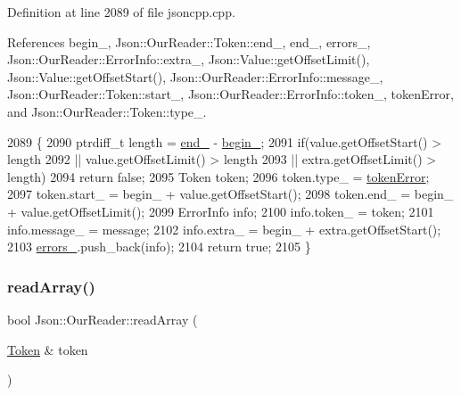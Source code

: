 Definition at line 2089 of file jsoncpp.\+cpp.



References begin\+\_\+, Json\+::\+Our\+Reader\+::\+Token\+::end\+\_\+, end\+\_\+, errors\+\_\+, Json\+::\+Our\+Reader\+::\+Error\+Info\+::extra\+\_\+, Json\+::\+Value\+::get\+Offset\+Limit(), Json\+::\+Value\+::get\+Offset\+Start(), Json\+::\+Our\+Reader\+::\+Error\+Info\+::message\+\_\+, Json\+::\+Our\+Reader\+::\+Token\+::start\+\_\+, Json\+::\+Our\+Reader\+::\+Error\+Info\+::token\+\_\+, token\+Error, and Json\+::\+Our\+Reader\+::\+Token\+::type\+\_\+.


\begin{DoxyCode}
2089                                                                                                \{
2090   ptrdiff\_t length = \hyperlink{class_json_1_1_our_reader_ab1f69b0260c27a0d2d65dc56e42c8f9d}{end\_} - \hyperlink{class_json_1_1_our_reader_a9bda9d72335d52cd06e65f9eca3f70f5}{begin\_};
2091   \textcolor{keywordflow}{if}(value.getOffsetStart() > length
2092     || value.getOffsetLimit() > length
2093     || extra.getOffsetLimit() > length)
2094     \textcolor{keywordflow}{return} \textcolor{keyword}{false};
2095   Token token;
2096   token.type\_ = \hyperlink{class_json_1_1_our_reader_a15116f7276ddf1e7a2cc3cbefa884dccad39f929b971de8dc55fe84a2d2e3465e}{tokenError};
2097   token.start\_ = begin\_ + value.getOffsetStart();
2098   token.end\_ = begin\_ + value.getOffsetLimit();
2099   ErrorInfo info;
2100   info.token\_ = token;
2101   info.message\_ = message;
2102   info.extra\_ = begin\_ + extra.getOffsetStart();
2103   \hyperlink{class_json_1_1_our_reader_afb76b68ba1ab68fe09cf2838e3d4898d}{errors\_}.push\_back(info);
2104   \textcolor{keywordflow}{return} \textcolor{keyword}{true};
2105 \}
\end{DoxyCode}
\mbox{\label{class_json_1_1_our_reader_a0b9f58faf4212c6ecb5d8e2a1ac10257}} 
\subsubsection{\texorpdfstring{read\+Array()}{readArray()}}
{\footnotesize\ttfamily bool Json\+::\+Our\+Reader\+::read\+Array (\begin{DoxyParamCaption}\item[{\hyperlink{class_json_1_1_our_reader_1_1_token}{Token} \&}]{token }\end{DoxyParamCaption})\hspace{0.3cm}{\ttfamily [private]}}



